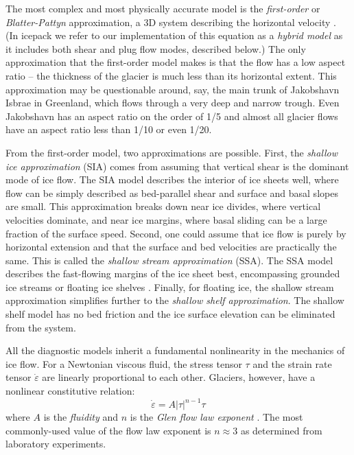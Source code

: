 \documentclass[journal abbreviation, manuscript]{copernicus}
\begin{document}
The most complex and most physically accurate model is the \emph{first-order} or \emph{Blatter-Pattyn} approximation, a 3D system describing the horizontal velocity \citep{blatter1995velocity, pattyn2003new}.
(In icepack we refer to our implementation of this equation as a \emph{hybrid model} as it includes both shear and plug flow modes, described below.)
The only approximation that the first-order model makes is that the flow has a low aspect ratio -- the thickness of the glacier is much less than its horizontal extent.
This approximation may be questionable around, say, the main trunk of Jakobshavn Isbrae in Greenland, which flows through a very deep and narrow trough.
Even Jakobshavn has an aspect ratio on the order of 1/5 and almost all glacier flows have an aspect ratio less than 1/10 or even 1/20.

From the first-order model, two approximations are possible.
First, the \emph{shallow ice approximation} (SIA) comes from assuming that vertical shear is the dominant mode of ice flow.
The SIA model \citep{hutter1981effect} describes the interior of ice sheets well, where flow can be simply described as bed-parallel shear and surface and basal slopes are small.
This approximation breaks down near ice divides, where vertical velocities dominate, and near ice margins, where basal sliding can be a large fraction of the surface speed.
Second, one could assume that ice flow is purely by horizontal extension and that the surface and bed velocities are practically the same.
This is called the \emph{shallow stream approximation} (SSA).
The SSA model describes the fast-flowing margins of the ice sheet best, encompassing grounded ice streams or floating ice shelves \citep{macayeal1989large}.
Finally, for floating ice, the shallow stream approximation simplifies further to the \emph{shallow shelf approximation}.
The shallow shelf model has no bed friction and the ice surface elevation can be eliminated from the system.

All the diagnostic models inherit a fundamental nonlinearity in the mechanics of ice flow.
For a Newtonian viscous fluid, the stress tensor $\tau$ and the strain rate tensor $\dot\varepsilon$ are linearly proportional to each other.
Glaciers, however, have a nonlinear constitutive relation:
\begin{equation}
    \dot\varepsilon = A|\tau|^{n - 1}\tau
\end{equation}
where $A$ is the \emph{fluidity} and $n$ is the \emph{Glen flow law exponent} \citep{cuffey2010physics}.
The most commonly-used value of the flow law exponent is $n \approx 3$ as determined from laboratory experiments.
\end{document}
